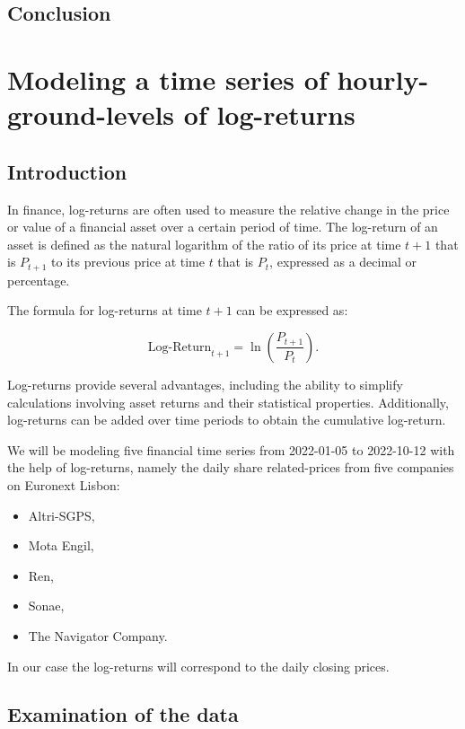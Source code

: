 \documentclass{article}
\begin{document}
\subsection{Conclusion}




\newpage

\section{Modeling a time series of hourly-ground-levels of log-returns}

\subsection{Introduction}

In finance, log-returns are often used to measure the relative change in the price or value of a financial asset over a certain period of time. The log-return of an asset is defined as the natural logarithm of the ratio of its price at time $t+1$ that is $P_{t+1}$  to its previous price at time $t$ that is $P_t$, expressed as a decimal or percentage.

The formula for log-returns at time $t+1$ can be expressed as:

\begin{equation*}
\text{Log-Return}_{t+1} = \ln \left(\frac{P_{t+1}}{P_t}\right).
\end{equation*}

Log-returns provide several advantages, including the ability to simplify calculations involving asset returns and their statistical properties. Additionally, log-returns can be added over time periods to obtain the cumulative log-return.

We will be modeling five financial time series from 2022-01-05 to 2022-10-12 with the help of log-returns, namely the daily share related-prices from five companies on Euronext Lisbon:  
\begin{itemize}
    \item Altri-SGPS,
    \item Mota Engil,
    \item Ren,
    \item Sonae,
    \item The Navigator Company.
\end{itemize} 
In our case the log-returns will correspond to the daily closing prices.

\subsection{Examination of the data}
\label{sect:2.2}
\end{document}
